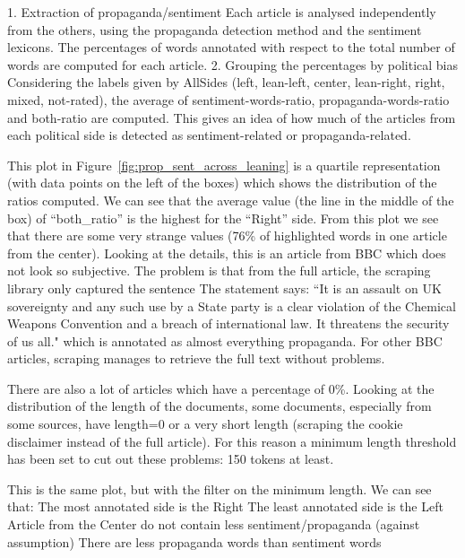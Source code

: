 1. Extraction of propaganda/sentiment
Each article is analysed independently from the others, using the propaganda detection method and the sentiment lexicons.
The percentages of words annotated with respect to the total number of words are computed for each article.
2. Grouping the percentages by political bias
Considering the labels given by AllSides (left, lean-left, center, lean-right, right, mixed, not-rated), the average of sentiment-words-ratio, propaganda-words-ratio and both-ratio are computed. This gives an idea of how much of the articles from each political side is detected as sentiment-related or propaganda-related.


This plot in Figure~\ref{fig:prop_sent_across_leaning} is a quartile representation (with data points on the left of the boxes) which shows the distribution of the ratios computed. We can see that the average value (the line in the middle of the box) of “both\_ratio” is the highest for the “Right” side.
From this plot we see that there are some very strange values (76\% of highlighted words in one article from the center). Looking at the details, this is an article from BBC which does not look so subjective. The problem is that from the full article, the scraping library only captured the sentence The statement says: ``It is an assault on UK sovereignty and any such use by a State party is a clear violation of the Chemical Weapons Convention and a breach of international law. It threatens the security of us all." which is annotated as almost everything propaganda. For other BBC articles, scraping manages to retrieve the full text without problems.

There are also a lot of articles which have a percentage of 0\%. Looking at the distribution of the length of the documents, some documents, especially from some sources, have length=0 or a very short length (scraping the cookie disclaimer instead of the full article).
For this reason a minimum length threshold has been set to cut out these problems: 150 tokens at least.

This is the same plot, but with the filter on the minimum length.
We can see that:
The most annotated side is the Right
The least annotated side is the Left
Article from the Center do not contain less sentiment/propaganda (against assumption)
There are less propaganda words than sentiment words



